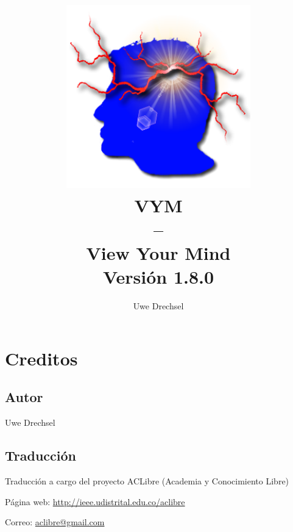 \documentclass{article}
\begin{document}
\title{
    \includegraphics[width=8cm]{images/vym-logo-new.png}
    \\
VYM \\ -- \\View Your Mind\\ {\small Versi\'on 1.8.0}}
\author{\textcopyright Uwe Drechsel  }


\maketitle

\newpage

\tableofcontents

\newpage
\section{Creditos}
\subsection{Autor}
Uwe Drechsel
\subsection{Traducci\'on}
Traducci\'on a cargo del proyecto ACLibre (Academia y Conocimiento Libre)

P\'agina web: 
        \href{http://ieee.udistrital.edu.co/aclibre}{http://ieee.udistrital.edu.co/aclibre}

Correo: 
        \href{mailto:aclibre@gmail.com}{aclibre@gmail.com}
\end{document}
